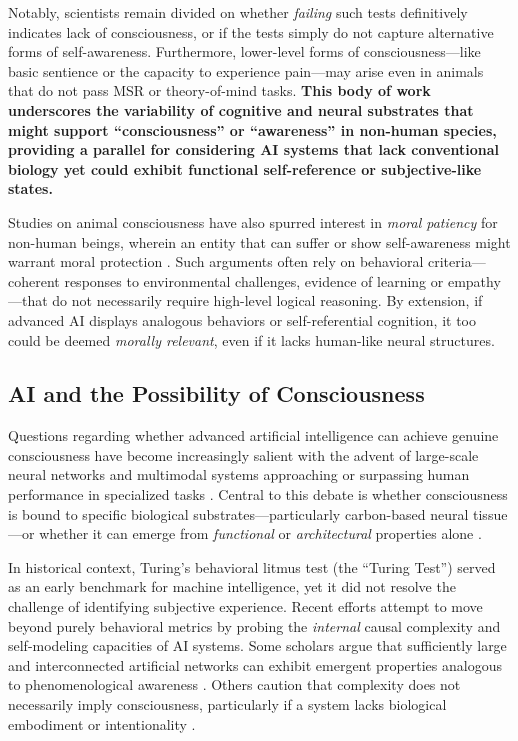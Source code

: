 \documentclass[12pt]{article}
\begin{document}
Notably, scientists remain divided on whether \emph{failing} such tests definitively indicates lack of consciousness, or if the tests simply do not capture alternative forms of self-awareness. Furthermore, lower-level forms of consciousness—like basic sentience or the capacity to experience pain—may arise even in animals that do not pass MSR or theory-of-mind tasks. \textbf{This body of work underscores the variability of cognitive and neural substrates that might support “consciousness” or “awareness” in non-human species, providing a parallel for considering AI systems that lack conventional biology yet could exhibit functional self-reference or subjective-like states.}

Studies on animal consciousness have also spurred interest in \emph{moral patiency} for non-human beings, wherein an entity that can suffer or show self-awareness might warrant moral protection \cite{DeGrazia1996}. Such arguments often rely on behavioral criteria—coherent responses to environmental challenges, evidence of learning or empathy—that do not necessarily require high-level logical reasoning. By extension, if advanced AI displays analogous behaviors or self-referential cognition, it too could be deemed \emph{morally relevant}, even if it lacks human-like neural structures.

\subsection*{AI and the Possibility of Consciousness}
\label{sec:ai_consciousness}

Questions regarding whether advanced artificial intelligence can achieve genuine consciousness have become increasingly salient with the advent of large-scale neural networks and multimodal systems approaching or surpassing human performance in specialized tasks \cite{OpenAI2023, McKinsey2023}. Central to this debate is whether consciousness is bound to specific biological substrates—particularly carbon-based neural tissue—or whether it can emerge from \emph{functional} or \emph{architectural} properties alone \cite{Goertzel2007, Schneider2020, Bostrom2014}.

In historical context, Turing’s \cite{Turing1950} behavioral litmus test (the “Turing Test”) served as an early benchmark for machine intelligence, yet it did not resolve the challenge of identifying subjective experience. Recent efforts attempt to move beyond purely behavioral metrics by probing the \emph{internal} causal complexity and self-modeling capacities of AI systems. Some scholars argue that sufficiently large and interconnected artificial networks can exhibit emergent properties analogous to phenomenological awareness \cite{ConsciousnessinAI2023, Tait2024}. Others caution that complexity does not necessarily imply consciousness, particularly if a system lacks biological embodiment or intentionality \cite{AIMindBody2022, AIDynamicRelevance2023}.
\end{document}
